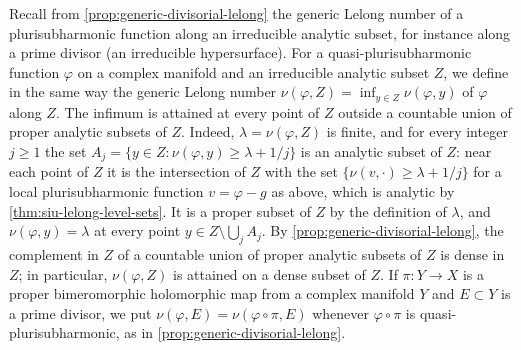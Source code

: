Recall from \cref{prop:generic-divisorial-lelong} the generic Lelong number of a plurisubharmonic function along an irreducible analytic subset, for instance along a prime divisor (an irreducible hypersurface). For a quasi-plurisubharmonic function $\varphi$ on a complex manifold and an irreducible analytic subset $Z$, we define in the same way the generic Lelong number $\nu(\varphi,Z)=\inf_{y\in Z}\nu(\varphi,y)$ of $\varphi$ along $Z$. The infimum is attained at every point of $Z$ outside a countable union of proper analytic subsets of $Z$. Indeed, $\lambda=\nu(\varphi,Z)$ is finite, and for every integer $j\geq1$ the set $A_j=\{y\in Z:\nu(\varphi,y)\geq\lambda+1/j\}$ is an analytic subset of $Z$: near each point of $Z$ it is the intersection of $Z$ with the set $\{\nu(v,\cdot)\geq\lambda+1/j\}$ for a local plurisubharmonic function $v=\varphi-g$ as above, which is analytic by \cref{thm:siu-lelong-level-sets}. It is a proper subset of $Z$ by the definition of $\lambda$, and $\nu(\varphi,y)=\lambda$ at every point $y\in Z\setminus\bigcup_jA_j$. By \cref{prop:generic-divisorial-lelong}, the complement in $Z$ of a countable union of proper analytic subsets of $Z$ is dense in $Z$; in particular, $\nu(\varphi,Z)$ is attained on a dense subset of $Z$. If $\pi\colon Y\to X$ is a proper bimeromorphic holomorphic map from a complex manifold $Y$ and $E\subset Y$ is a prime divisor, we put $\nu(\varphi,E)=\nu(\varphi\circ\pi,E)$ whenever $\varphi\circ\pi$ is quasi-plurisubharmonic, as in \cref{prop:generic-divisorial-lelong}.

